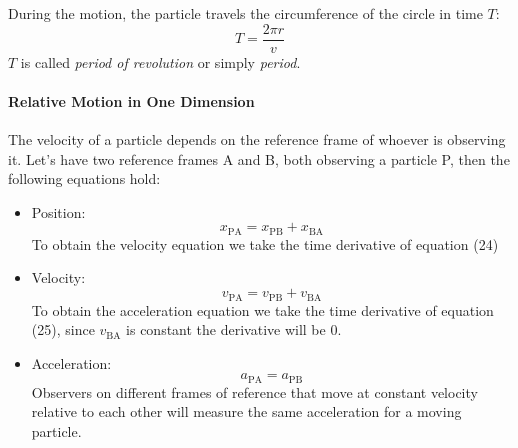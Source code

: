 \documentclass{scrartcl}
\begin{document}
    During the motion, the particle travels the circumference of the circle in time $T$:
    \begin{equation}
        T = \frac{2\pi r}{v}
    \end{equation}
    $T$ is called \emph{period of revolution} or simply \emph{period}.
    
    \paragraph{Relative Motion in One Dimension} The velocity of a particle depends on the reference frame of whoever is observing it. Let's have two reference frames A and B, both observing a particle P, then the following equations hold:
    \begin{itemize}
        \item Position:
        \begin{equation}
            x_{\mathrm{PA}} = x_{\mathrm{PB}} + x_{\mathrm{BA}}
        \end{equation}
        To obtain the velocity equation we take the time derivative of equation (24)
        \item Velocity:
        \begin{equation}
            v_{\mathrm{PA}} = v_{\mathrm{PB}} + v_{\mathrm{BA}}
        \end{equation}
        To obtain the acceleration equation we take the time derivative of equation (25), since $v_{\mathrm{BA}}$ is constant the derivative will be $0$.
        \item Acceleration:
        \begin{equation}
            a_{\mathrm{PA}} = a_{\mathrm{PB}}
        \end{equation}
        Observers on different frames of reference that move at constant velocity relative to each other will measure the same acceleration for a moving particle.
    \end{itemize}
\end{document}
